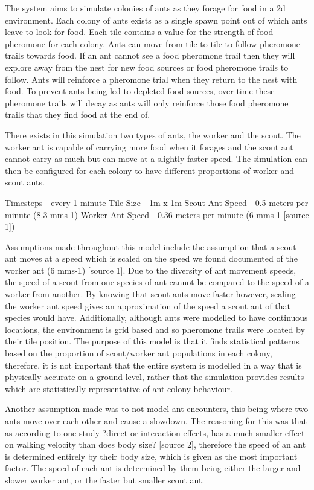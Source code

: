 The system aims to simulate colonies of ants as they forage for food in a 2d environment. Each colony of ants exists as a single spawn point out of which ants leave to look for food. Each tile contains a value for the strength of food pheromone for each colony. Ants can move from tile to tile to follow pheromone trails towards food. If an ant cannot see a food pheromone trail then they will explore away from the nest for new food sources or food pheromone trails to follow. Ants will reinforce a pheromone trial when they return to the nest with food. To prevent ants being led to depleted food sources, over time these pheromone trails will decay as ants will only reinforce those food pheromone trails that they find food at the end of. 

There exists in this simulation two types of ants, the worker and the scout. The worker ant is capable of carrying more food when it forages and the scout ant cannot carry as much but can move at a slightly faster speed. The simulation can then be configured for each colony to have different proportions of worker and scout ants. 

Timesteps - every 1 minute
Tile Size - 1m x 1m 
Scout Ant Speed - 0.5 meters per minute (8.3 mms-1)
Worker Ant Speed - 0.36 meters per minute (6 mms-1 [source 1]) 

Assumptions made throughout this model include the assumption that a scout ant moves at a speed which is scaled on the speed we found documented of the worker ant (6 mms-1) [source 1]. Due to the diversity of ant movement speeds, the speed of a scout from one species of ant cannot be compared to the speed of a worker from another. By knowing that scout ants move faster however, scaling the worker ant speed gives an approximation of the speed a scout ant of that species would have. Additionally, although ants were modelled to have continuous locations, the environment is grid based and so pheromone trails were located by their tile position. The purpose of this model is that it finds statistical patterns based on the proportion of scout/worker ant populations in each colony, therefore, it is not important that the entire system is modelled in a way that is physically accurate on a ground level, rather that the simulation provides results which are statistically representative of ant colony behaviour. 

Another assumption made was to not model ant encounters, this being where two ants move over each other and cause a slowdown. The reasoning for this was that as according to one study ?direct or interaction effects, has a much smaller effect on walking velocity than does body size? [source 2], therefore the speed of an ant is determined entirely by their body size, which is given as the most important factor. The speed of each ant is determined by them being either the larger and slower worker ant, or the faster but smaller scout ant.

